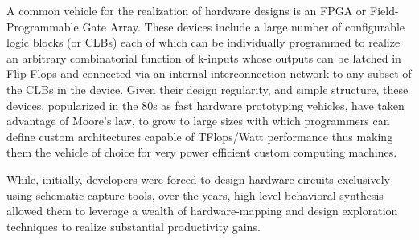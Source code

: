A common vehicle for the realization of hardware designs is an FPGA or Field-Programmable Gate Array. These devices include a large number of configurable logic blocks (or CLBs) each of which can be individually programmed to realize an arbitrary combinatorial function of k-inputs  whose outputs can be latched in Flip-Flops and connected via an internal interconnection network to any subset of the CLBs in the device.  Given their  design regularity, and simple structure, these devices, popularized in the 80s as fast hardware prototyping vehicles, have taken advantage of Moore's law, to grow to large sizes with which programmers can define custom architectures capable of TFlops/Watt performance thus making them the vehicle of choice for very power efficient custom computing machines. 

While, initially, developers were forced to design hardware circuits exclusively using schematic-capture tools, over the years, high-level behavioral synthesis allowed them to leverage a wealth of hardware-mapping and design exploration techniques to realize substantial productivity gains.  

